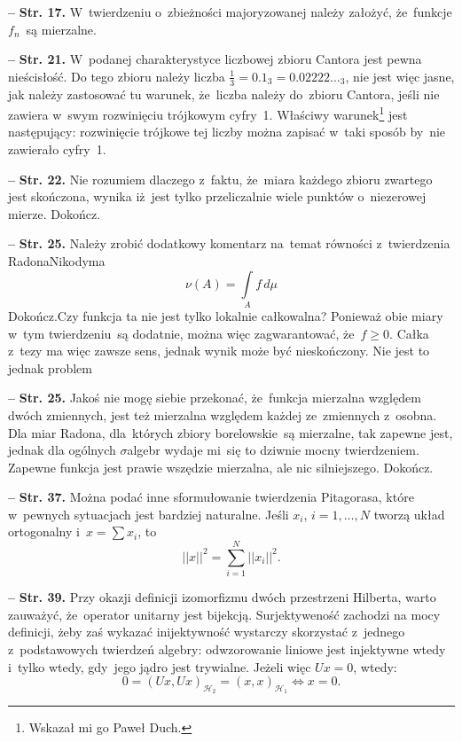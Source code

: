 \documentclass[a4paper,11pt]{article}
\newcommand{\ld}{\ldots}
\newcommand{\fr}{\frac}
\newcommand{\mc}{\mathcal}
\newcommand{\wtw}{wtedy i~tylko wtedy}
\newcommand{\si}{\sigma}
\newcommand{\Hc}{\mc{H}}
\newcommand{\Sum}{\sum\limits}
\newcommand{\Int}{\int\limits}
\newcommand{\IntSet}[3]{\Int_{ #1 } #2 \, d#3} %
\newcommand{\norm}[1]{\left|\left| #1 \right|\right|}
\newcommand{\tb}{\textbf}
\newcommand{\noi}{\noindent}
\newcommand{\start}{\noi \tb{--} {}}
\newcommand{\Str}[1]{\tb{Str. #1.}}
\newcommand{\Dok}{{\color{red} Dokończ.}}
\begin{document}
\start \Str{17} W~twierdzeniu o~zbieżności majoryzowanej należy
założyć, że~funkcje $f_{ n }$~są mierzalne.

\start \Str{21} W~podanej charakterystyce liczbowej zbioru Cantora
jest pewna nieścisłość. Do tego zbioru należy liczba
$\fr{ 1 }{ 3 } = 0.1_{ 3 } = 0.02222\ld_{ 3 }$, nie jest więc jasne,
jak należy zastosować tu warunek, że~liczba należy do~zbioru Cantora,
jeśli nie zawiera w~swym rozwinięciu trójkowym cyfry~1. Właściwy
warunek\footnote{Wskazał mi go Paweł Duch.} jest następujący:
rozwinięcie trójkowe tej liczby można zapisać w~taki sposób by~nie
zawierało cyfry~1.

\start \Str{22} Nie rozumiem dlaczego z~faktu, że~miara każdego zbioru
zwartego jest skończona, wynika iż~jest tylko przeliczalnie wiele
punktów o~niezerowej mierze. \Dok

\start \Str{25} Należy zrobić dodatkowy komentarz na~temat równości
z~twierdzenia Radona\dywiz Nikodyma
\begin{equation}
  \label{eq:2}
  \nu( A ) = \IntSet{ A }{ f }{ \mu }
\end{equation}
\Dok Czy funkcja ta nie jest tylko lokalnie całkowalna? Ponieważ obie
miary w~tym twierdzeniu~są dodatnie, można więc zagwarantować,
że~$f \geq 0$. Całka z~tezy ma więc zawsze sens, jednak wynik może być
nieskończony. Nie jest to jednak problem

\start \Str{25} Jakoś nie mogę siebie przekonać, że~funkcja mierzalna
względem dwóch zmiennych, jest też mierzalna względem każdej
ze~zmiennych z~osobna. Dla miar Radona, dla~których zbiory
borelowskie~są mierzalne, tak zapewne jest, jednak dla ogólnych
$\si$\dywiz algebr wydaje mi~się to dziwnie mocny twierdzeniem.
Zapewne funkcja jest prawie wszędzie mierzalna, ale nic silniejszego.
\Dok

\start \Str{37} Można podać inne sformułowanie twierdzenia Pitagorasa,
które w~pewnych sytuacjach jest bardziej naturalne. Jeśli $x_{ i }$,
$i = 1, \ld, N$ tworzą układ ortogonalny i~$x = \Sum x_{ i }$, to
\begin{displaymath}
  \norm{ x }^{ 2 } = \Sum_{ i = 1 }^{ N } \norm{ x_{ i } }^{ 2 }.
\end{displaymath}

\start \Str{39} Przy okazji definicji izomorfizmu dwóch przestrzeni
Hilberta, warto zauważyć, że~operator unitarny jest bijekcją.
Surjektyweność zachodzi na mocy definicji, żeby zaś wykazać
inijektywność wystarczy skorzystać z~jednego z~podstawowych twierdzeń
algebry: odwzorowanie liniowe jest injektywne \wtw, gdy~jego jądro
jest trywialne. Jeżeli więc $Ux = 0$, wtedy:
\begin{displaymath}
  0 = ( Ux, Ux )_{ \Hc_{ 2 } } = ( x, x )_{ \Hc_{ 1 } } \iff x = 0.
\end{displaymath}
\end{document}
